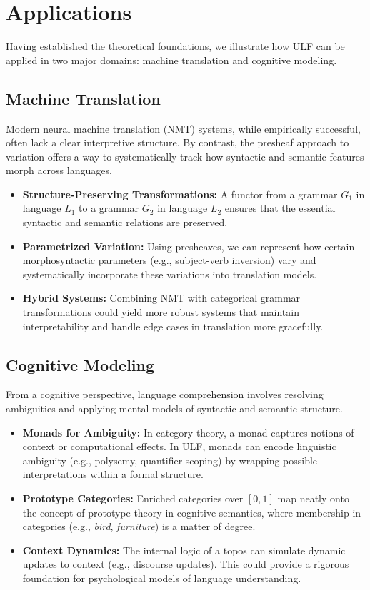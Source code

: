 \documentclass[12pt]{article}
\theoremstyle{plain}
\theoremstyle{definition}
\begin{document}
\section{Applications}
Having established the theoretical foundations, we illustrate how ULF can be applied in two major domains: machine translation and cognitive modeling.

\subsection{Machine Translation}
Modern neural machine translation (NMT) systems, while empirically successful, often lack a clear interpretive structure. By contrast, the presheaf approach to variation offers a way to systematically track how syntactic and semantic features morph across languages.

\begin{itemize}
    \item \textbf{Structure-Preserving Transformations:} A functor from a grammar \(G_1\) in language \(L_1\) to a grammar \(G_2\) in language \(L_2\) ensures that the essential syntactic and semantic relations are preserved. 
    \item \textbf{Parametrized Variation:} Using presheaves, we can represent how certain morphosyntactic parameters (e.g., subject-verb inversion) vary and systematically incorporate these variations into translation models.
    \item \textbf{Hybrid Systems:} Combining NMT with categorical grammar transformations could yield more robust systems that maintain interpretability and handle edge cases in translation more gracefully.
\end{itemize}

\subsection{Cognitive Modeling}
From a cognitive perspective, language comprehension involves resolving ambiguities and applying mental models of syntactic and semantic structure. 

\begin{itemize}
    \item \textbf{Monads for Ambiguity:} In category theory, a monad captures notions of context or computational effects. In ULF, monads can encode linguistic ambiguity (e.g., polysemy, quantifier scoping) by wrapping possible interpretations within a formal structure.
    \item \textbf{Prototype Categories:} Enriched categories over \([0,1]\) map neatly onto the concept of prototype theory in cognitive semantics, where membership in categories (e.g., \emph{bird}, \emph{furniture}) is a matter of degree.
    \item \textbf{Context Dynamics:} The internal logic of a topos can simulate dynamic updates to context (e.g., discourse updates). This could provide a rigorous foundation for psychological models of language understanding.
\end{itemize}
\end{document}
